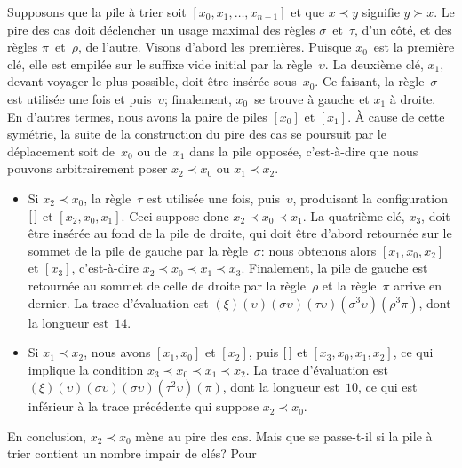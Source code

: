 Supposons que la pile à trier soit \([x_0, x_1, \dots, x_{n-1}]\) et
que \(x \prec y\) signifie \(y \succ x\). Le pire des cas doit
déclencher un usage maximal des règles \(\sigma\)~et~\(\tau\), d'un
côté, et des règles \(\pi\)~et~\(\rho\), de l'autre. Visons d'abord
les premières. Puisque \(x_0\)~est la première clé, elle est empilée
sur le suffixe vide initial par la règle~\(\upsilon\). La deuxième
clé, \(x_1\), devant voyager le plus possible, doit être insérée
sous~\(x_0\). Ce faisant, la règle~\(\sigma\) est utilisée une fois et
puis~\(\upsilon\); finalement, \(x_0\)~se trouve à gauche et \(x_1\) à
droite. En d'autres termes, nous avons la paire de piles \([x_0]\) et
\([x_1]\). À cause de cette symétrie, la suite de la construction du
pire des cas se poursuit par le déplacement soit de~\(x_0\) ou
de~\(x_1\) dans la pile opposée, c'est-à-dire que nous pouvons
arbitrairement poser \(x_2 \prec x_0\) ou \(x_1 \prec x_2\).
\begin{itemize}

\item Si \(x_2 \prec x_0\), la règle~\(\tau\) est utilisée une fois,
  puis~\(\upsilon\), produisant la configuration \([\,]\) et \([x_2,
  x_0, x_1]\). Ceci suppose donc \(x_2 \prec x_0 \prec x_1\). La
  quatrième clé, \(x_3\), doit être insérée au fond de la pile de
  droite, qui doit être d'abord retournée sur le sommet de la pile de
  gauche par la règle~\(\sigma\): nous obtenons alors \([x_1, x_0,
  x_2]\) et \([x_3]\), c'est-à-dire \(x_2 \prec x_0 \prec x_1 \prec
  x_3\). Finalement, la pile de gauche est retournée au sommet de
  celle de droite par la règle~\(\rho\) et la règle~\(\pi\) arrive en
  dernier. La trace d'évaluation est
  \((\xi)(\upsilon)(\sigma\upsilon)(\tau\upsilon)(\sigma^3\upsilon)
  (\rho^3\pi)\), dont la longueur est~\(14\).

\item Si \(x_1 \prec x_2\), nous avons \([x_1, x_0]\) et \([x_2]\),
  puis \([\,]\) et \([x_3, x_0, x_1, x_2]\), ce qui implique la
  condition \(x_3 \prec x_0 \prec x_1 \prec x_2\). La trace
  d'évaluation est
  \((\xi)(\upsilon)(\sigma\upsilon)(\sigma\upsilon)(\tau^2\upsilon)
  (\pi)\), dont la longueur est~\(10\), ce qui est inférieur à la
  trace précédente qui suppose \(x_2 \prec x_0\).

\end{itemize}
En conclusion, \(x_2 \prec x_0\) mène au pire des cas. Mais que se
passe-t-il si la pile à trier contient un nombre impair de clés?  Pour
